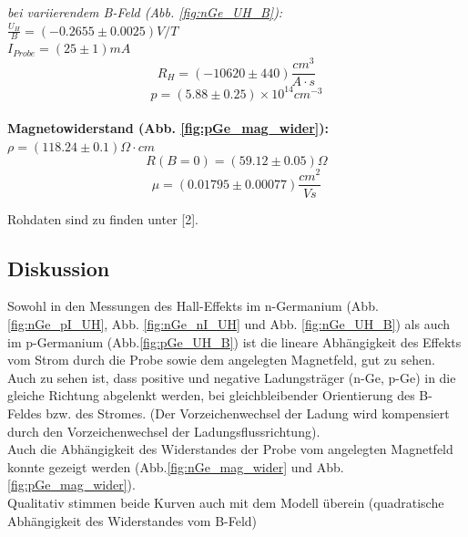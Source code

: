 \documentclass[12pt,a4paper]{article}
\begin{document}
\begin{multicols}{2}


\noindent \emph{bei variierendem B-Feld (Abb. \ref{fig:nGe_UH_B}):}\\

\noindent$\frac{U_H}{B}=(-0.2655 \pm 0.0025)V/T$\\
$I_{Probe}=(25 \pm 1)mA$\\
$$R_H=(-10620 \pm 440)\frac{cm^3}{A\cdot s}$$
$$p=(5.88\pm 0.25)\times 10^{14}cm^{-3}$$\\

\noindent \textbf{Magnetowiderstand (Abb. \ref{fig:pGe_mag_wider}):}\\
$\rho=(118.24 \pm 0.1)\Omega \cdot cm$
$$R(B=0) = (59.12 \pm 0.05)\Omega$$
$$\mu=(0.01795 \pm 0.00077)\frac{cm^2}{Vs}$$



Rohdaten sind zu finden unter [2].

\subsection{Diskussion}

Sowohl in den Messungen des Hall-Effekts im n-Germanium (Abb. \ref{fig:nGe_pI_UH}, Abb. \ref{fig:nGe_nI_UH} und Abb. \ref{fig:nGe_UH_B}) als auch im p-Germanium (Abb.\ref{fig:pGe_UH_B}) ist die lineare Abhängigkeit des Effekts vom Strom durch die Probe sowie dem angelegten Magnetfeld, gut zu sehen.\\
Auch zu sehen ist, dass positive und negative Ladungsträger (n-Ge, p-Ge) in die gleiche Richtung abgelenkt werden, bei gleichbleibender Orientierung des B-Feldes bzw. des Stromes. (Der Vorzeichenwechsel der Ladung wird kompensiert durch den Vorzeichenwechsel der Ladungsflussrichtung).\\
Auch die Abhängigkeit des Widerstandes der Probe vom angelegten Magnetfeld konnte gezeigt werden (Abb.\ref{fig:nGe_mag_wider} und Abb. \ref{fig:pGe_mag_wider}).\\
Qualitativ stimmen beide Kurven auch mit dem Modell überein (quadratische Abhängigkeit des Widerstandes vom B-Feld)


\end{multicols}
\end{document}

